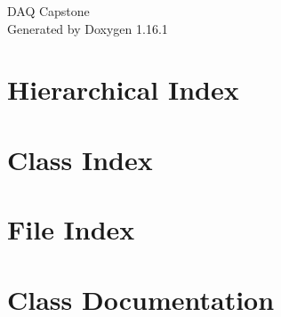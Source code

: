 \documentclass[twoside]{book}
\newcommand{\+}{\discretionary{\mbox{\scriptsize$\hookleftarrow$}}{}{}}
\newcommand{\clearemptydoublepage}{%
    \newpage{\pagestyle{empty}\cleardoublepage}%
  }
\begin{document}
  \raggedbottom
    \hypersetup{pageanchor=false,
                bookmarksnumbered=true,
                pdfencoding=unicode
               }
  \begin{titlepage}
  \vspace*{7cm}
  \begin{center}%
  {\Large DAQ Capstone}\\
  \vspace*{1cm}
  {\large Generated by Doxygen 1.16.1}\\
  \end{center}
  \end{titlepage}
  \clearemptydoublepage
  \tableofcontents
  \clearemptydoublepage
  \hypersetup{pageanchor=true}
\chapter{Hierarchical Index}

\chapter{Class Index}

\chapter{File Index}

\chapter{Class Documentation}
































\end{document}
